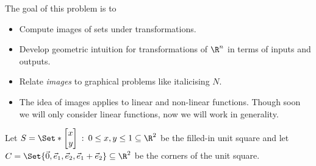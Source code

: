 	\question
	\begin{annotation}
		\begin{goals}

			The goal of this problem is to
			\begin{itemize}
				\item Compute images of sets under transformations.
				\item Develop geometric intuition for transformations of $\R^n$
					in terms of inputs and outputs.
				\item Relate \emph{images} to graphical problems like italicising $N$.
			\end{itemize}
		\end{goals}

		\begin{notes}
			\begin{itemize}
				\item The idea of images applies to linear and non-linear functions.
					Though soon we will only consider linear functions, now
					we will work in generality.
			\end{itemize}
		\end{notes}
	\end{annotation}
	Let $S=\Set*{\mat{x\\y} \given 0\leq x,y\leq 1}\subseteq \R^2$ be the filled-in unit
	square and let $C=\Set{\vec 0, \xhat,\yhat,\xhat+\yhat}\subseteq \R^2$
	be the corners of the unit square.
